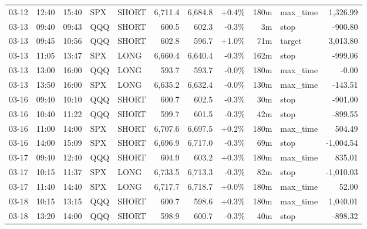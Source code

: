 \documentclass[11pt,a4paper,twoside]{article}
\begin{document}
\begin{center}
\begin{longtable}{>{\color{txtmain}}l l l l l r r r r >{\color{txtmain}}l r}
03-12 & 12:40 & 15:40 & SPX & SHORT & 6,711.4 & 6,684.8 & \textcolor{wingreen}{+0.4\%} & 180m & max\_time & \textcolor{wingreen}{1,326.99} \\
03-13 & 09:40 & 09:43 & QQQ & SHORT & 600.5 & 602.3 & \textcolor{lossred}{-0.3\%} & 3m & stop & \textcolor{lossred}{-900.80} \\
03-13 & 09:45 & 10:56 & QQQ & SHORT & 602.8 & 596.7 & \textcolor{wingreen}{+1.0\%} & 71m & target & \textcolor{wingreen}{3,013.80} \\
03-13 & 11:05 & 13:47 & SPX & LONG & 6,660.4 & 6,640.4 & \textcolor{lossred}{-0.3\%} & 162m & stop & \textcolor{lossred}{-999.06} \\
03-13 & 13:00 & 16:00 & QQQ & LONG & 593.7 & 593.7 & \textcolor{lossred}{-0.0\%} & 180m & max\_time & \textcolor{lossred}{-0.00} \\
03-13 & 13:50 & 16:00 & SPX & LONG & 6,635.2 & 6,632.4 & \textcolor{lossred}{-0.0\%} & 130m & max\_time & \textcolor{lossred}{-143.51} \\
03-16 & 09:40 & 10:10 & QQQ & SHORT & 600.7 & 602.5 & \textcolor{lossred}{-0.3\%} & 30m & stop & \textcolor{lossred}{-901.00} \\
03-16 & 10:40 & 11:22 & QQQ & SHORT & 599.7 & 601.5 & \textcolor{lossred}{-0.3\%} & 42m & stop & \textcolor{lossred}{-899.55} \\
03-16 & 11:00 & 14:00 & SPX & SHORT & 6,707.6 & 6,697.5 & \textcolor{wingreen}{+0.2\%} & 180m & max\_time & \textcolor{wingreen}{504.49} \\
03-16 & 14:00 & 15:09 & SPX & SHORT & 6,696.9 & 6,717.0 & \textcolor{lossred}{-0.3\%} & 69m & stop & \textcolor{lossred}{-1,004.54} \\
03-17 & 09:40 & 12:40 & QQQ & SHORT & 604.9 & 603.2 & \textcolor{wingreen}{+0.3\%} & 180m & max\_time & \textcolor{wingreen}{835.01} \\
03-17 & 10:15 & 11:37 & SPX & LONG & 6,733.5 & 6,713.3 & \textcolor{lossred}{-0.3\%} & 82m & stop & \textcolor{lossred}{-1,010.03} \\
03-17 & 11:40 & 14:40 & SPX & LONG & 6,717.7 & 6,718.7 & \textcolor{wingreen}{+0.0\%} & 180m & max\_time & \textcolor{wingreen}{52.00} \\
03-18 & 10:15 & 13:15 & QQQ & SHORT & 600.7 & 598.6 & \textcolor{wingreen}{+0.3\%} & 180m & max\_time & \textcolor{wingreen}{1,040.01} \\
03-18 & 13:20 & 14:00 & QQQ & SHORT & 598.9 & 600.7 & \textcolor{lossred}{-0.3\%} & 40m & stop & \textcolor{lossred}{-898.32} \\

\end{longtable}
\end{center}
\end{document}
